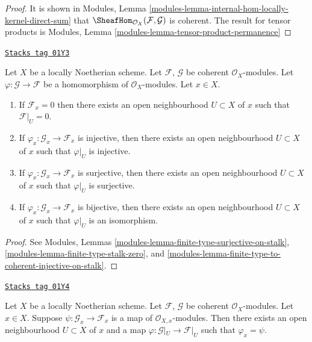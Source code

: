 \begin{proof}
It is shown in
Modules, Lemma \ref{modules-lemma-internal-hom-locally-kernel-direct-sum} that
$\SheafHom_{\mathcal{O}_X}(\mathcal{F}, \mathcal{G})$ is coherent.
The result for tensor products is
Modules, Lemma \ref{modules-lemma-tensor-product-permanence}
\end{proof}

\begin{lemma}
\label{coherent-lemma-local-isomorphism}
\href{https://stacks.math.columbia.edu/tag/01Y3}{\texttt{Stacks tag 01Y3}}

Let $X$ be a locally Noetherian scheme.
Let $\mathcal{F}$, $\mathcal{G}$ be coherent $\mathcal{O}_X$-modules.
Let $\varphi : \mathcal{G} \to \mathcal{F}$ be a homomorphism
of $\mathcal{O}_X$-modules. Let $x \in X$.
\begin{enumerate}
\item If $\mathcal{F}_x = 0$ then there exists an open neighbourhood
$U \subset X$ of $x$ such that $\mathcal{F}|_U = 0$.
\item If $\varphi_x : \mathcal{G}_x \to \mathcal{F}_x$ is injective,
then there exists an open neighbourhood $U \subset X$ of $x$ such that
$\varphi|_U$ is injective.
\item If $\varphi_x : \mathcal{G}_x \to \mathcal{F}_x$ is surjective,
then there exists an open neighbourhood $U \subset X$ of $x$ such that
$\varphi|_U$ is surjective.
\item If $\varphi_x : \mathcal{G}_x \to \mathcal{F}_x$ is bijective,
then there exists an open neighbourhood $U \subset X$ of $x$ such that
$\varphi|_U$ is an isomorphism.
\end{enumerate}
\end{lemma}

\begin{proof}
See Modules, Lemmas
\ref{modules-lemma-finite-type-surjective-on-stalk},
\ref{modules-lemma-finite-type-stalk-zero}, and
\ref{modules-lemma-finite-type-to-coherent-injective-on-stalk}.
\end{proof}

\begin{lemma}
\label{coherent-lemma-map-stalks-local-map}
\href{https://stacks.math.columbia.edu/tag/01Y4}{\texttt{Stacks tag 01Y4}}

Let $X$ be a locally Noetherian scheme.
Let $\mathcal{F}$, $\mathcal{G}$ be coherent $\mathcal{O}_X$-modules.
Let $x \in X$.
Suppose $\psi : \mathcal{G}_x \to \mathcal{F}_x$ is a map of
$\mathcal{O}_{X, x}$-modules.
Then there exists an open neighbourhood $U \subset X$ of $x$ and a map
$\varphi : \mathcal{G}|_U \to \mathcal{F}|_U$ such that
$\varphi_x = \psi$.
\end{lemma}

